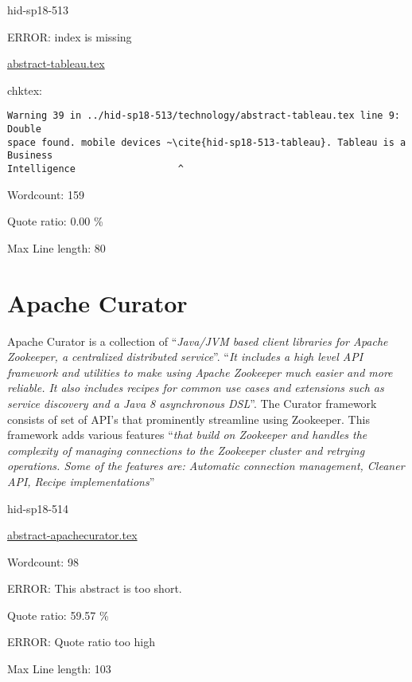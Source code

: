 \begin{IU}

hid-sp18-513

ERROR: index is missing

\href{https://github.com/cloudmesh-community/hid-sp18-513/blob/master//technology/abstract-tableau.tex}{abstract-tableau.tex}

 
chktex:
\begin{tiny}
\begin{verbatim}
Warning 39 in ../hid-sp18-513/technology/abstract-tableau.tex line 9: Double
space found. mobile devices ~\cite{hid-sp18-513-tableau}. Tableau is a Business
Intelligence                  ^
\end{verbatim}
\end{tiny}

Wordcount: 159


Quote ratio: 0.00 \%
 
Max Line length: 80
\end{IU}

\section{Apache Curator}

Apache Curator is a collection of \color{blue}``\emph{Java/JVM based client libraries for
Apache Zookeeper, a centralized distributed
service}''\color{black}\cite{hid-sp18-514-apachecurator}.  \color{blue}``\emph{It includes a high level
API framework and utilities to make using Apache Zookeeper much easier
and more reliable.  It also includes recipes for common use cases and
extensions such as service discovery and a Java 8 asynchronous
DSL}''\color{black}\cite{hid-sp18-514-apachecurator}.  The Curator framework consists
of set of API's that prominently streamline using Zookeeper.  This
framework adds various features \color{blue}``\emph{that build on Zookeeper and handles
the complexity of managing connections to the Zookeeper cluster and
retrying operations.  Some of the features are: Automatic connection
management, Cleaner API, Recipe
implementations}''\color{black}\cite{hid-sp18-514-apachecuratorfeatures}


\begin{IU}

hid-sp18-514

\href{https://github.com/cloudmesh-community/hid-sp18-514/blob/master//technology/abstract-apachecurator.tex}{abstract-apachecurator.tex}

 

Wordcount: 98

ERROR: This abstract is too short.


Quote ratio: 59.57 \%

ERROR: Quote ratio too high
 
Max Line length: 103
\end{IU}

